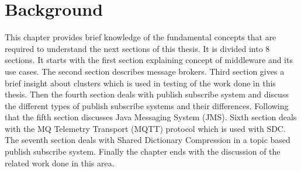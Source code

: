 \chapter{Background}\label{chapter:background}

This chapter provides brief knowledge of the fundamental concepts that are required to understand the next sections of this thesis. It is divided into 8 sections. It starts with the first section explaining concept of middleware and its use cases. The second section describes message brokers. Third section gives a brief insight about clusters which is used in testing of the work done in this thesis. Then the fourth section deals with publish subscribe system and discuss the different types of publish subscribe systems and their differences. Following that the fifth section discusses Java Messaging System (JMS). Sixth section deals with the MQ Telemetry Transport (MQTT) protocol which is used with SDC. The seventh section deals with Shared Dictionary Compression in a topic based publish subscribe system. Finally the chapter ends with the discussion of the related work done in this area.
